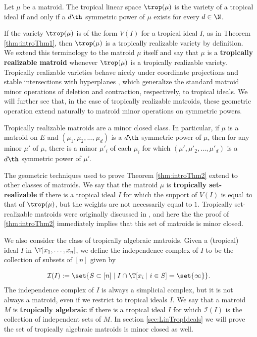 \begin{theorem}\label{thm:introThm1}
Let $\mu$ be a matroid. The tropical linear space $\trop(\mu)$ is the variety of a tropical ideal if and only if a $d\th$ symmetric power of $\mu$ exists for every $d\in \N$.
\end{theorem}

If the variety $\trop(\mu)$ is of the form $V(I)$ for a tropical ideal $I$, as in Theorem \ref{thm:introThm1}, then $\trop(\mu)$ is a tropically realizable variety by definition. We extend this terminology to the matroid $\mu$ itself and say that $\mu$ is a \textbf{tropically realizable matroid} whenever $\trop(\mu)$ is a tropically realizable variety. Tropically realizable varieties behave nicely under coordinate projections and stable intersections with hyperplanes \cite{MR20}, which generalize the standard matroid minor operations of deletion and contraction, respectively, to tropical ideals. We will further see that, in the case of tropically realizable matroids, these geometric operation extend naturally to matroid minor operations on symmetric powers.

\begin{theorem}\label{thm:introThm2}
Tropically realizable matroids are a minor closed class. In particular, if $\mu$ is a matroid on $E$ and $(\mu_1,\mu_2,\dots,\mu_d)$ is a $d\th$ symmetric power of $\mu$, then for any minor $\mu'$ of $\mu$, there is a minor $\mu'_i$ of each $\mu_i$ for which $(\mu',\mu'_2,\dots, \mu'_d)$ is a $d\th$ symmetric power of $\mu'$.
\end{theorem}

The geometric techniques used to prove Theorem \ref{thm:introThm2} extend to other classes of matroids. We say that the matroid $\mu$ is \textbf{tropically set-realizable} if there is a tropical ideal $I$ for which the support of $V(I)$ is equal to that of $\trop(\mu)$, but the weights are not necessarily equal to $1$. Tropically set-realizable matroids were originally discussed in \cite{Yu17}, and here the the proof of \ref{thm:introThm2} immediately implies that this set of matroids is minor closed. 

We also consider the class of tropically algebraic matroids. Given a (tropical) ideal $I$ in $\T[x_1,\dots,x_n]$, we define the independence complex of $I$ to be the collection of subsets of $[n]$ given by

$$\mathcal{I}(I):= \set{S\subset [n]\mid I\cap \T[x_i\mid i\in S]= \set{\infty}}.$$
The independence complex of $I$ is always a simplicial complex, but it is not always a matroid, even if we restrict to tropical ideals $I$. We say that a matroid $M$ is \textbf{tropically algebraic} if there is a tropical ideal $I$ for which $\mathcal{I}(I)$ is the collection of independent sets of $M$. In section \ref{sec:LinTropIdeals} we will prove the set of tropically algebraic matroids is minor closed as well. 

